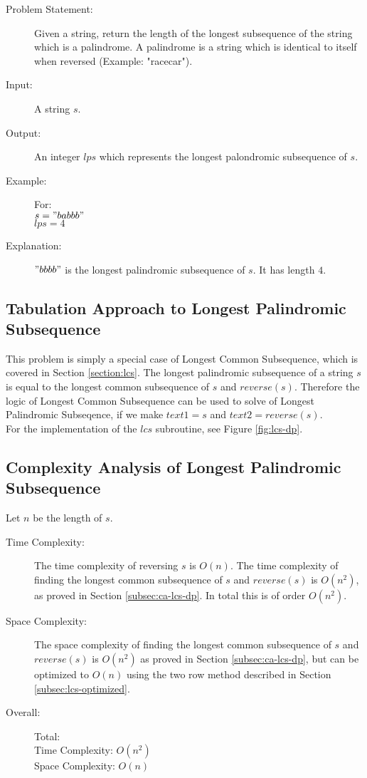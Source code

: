 \begin{description}
    \item[Problem Statement:]
        Given a string, return the length of the longest subsequence of the string which is a palindrome. A palindrome is a string which is identical to itself when reversed (Example: "racecar").
    
    \item[Input:]
        A string $s$.
        
    \item[Output:]
        An integer $lps$ which represents the longest palondromic subsequence of $s$.
        
    \item[Example:] For:\\
        $s = "babbb"$\\
        $lps = 4$
        
    \item[Explanation:]
        $"bbbb"$ is the longest palindromic subsequence of $s$. It has length $4$.
\end{description}

\subsection{Tabulation Approach to Longest Palindromic Subsequence}
This problem is simply a special case of Longest Common Subsequence,
which is covered in Section \ref{section:lcs}.
The longest palindromic subsequence of a string $s$ is equal to the longest common subsequence of $s$ and $reverse(s)$.
Therefore the logic of Longest Common Subsequence can be used to solve of Longest Palindromic Subseqence, if we make $text1=s$ and $text2=reverse(s)$.\\
For the implementation of the $lcs$ subroutine, see Figure \ref{fig:lcs-dp}.

\subsection{Complexity Analysis of Longest Palindromic Subsequence}
Let $n$ be the length of $s$.
\begin{description}
    \item[Time Complexity:]
        The time complexity of reversing $s$ is $O(n)$.
        The time complexity of finding the longest common subsequence of $s$ and $reverse(s)$ is $O(n^2)$, as proved in Section \ref{subsec:ca-lcs-dp}.
        In total this is of order $O(n^2)$.
        
    \item[Space Complexity:] 
        The space complexity of finding the longest common subsequence of $s$ and $reverse(s)$ is $O(n^2)$ as proved in Section \ref{subsec:ca-lcs-dp},
        but can be optimized to $O(n)$ using the two row method described in Section \ref{subsec:lcs-optimized}.
        
    \item[Overall:] Total:\\
        Time Complexity: $O(n^2)$\\
        Space Complexity: $O(n)$
    
\end{description}